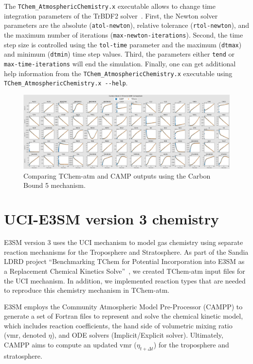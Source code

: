 \documentclass[report, 12pt]{SANDreport}
\begin{document}
The \verb|TChem_AtmosphericChemistry.x| executable allows to change time integration parameters of the TrBDF2 solver~\cite{tinesweb}. First, the Newton solver parameters are the absolute (\verb|atol-newton|), relative tolerance (\verb|rtol-newton|), and the maximum number of iterations (\verb|max-newton-iterations|). Second, the time step size is controlled using the \verb|tol-time| parameter and the maximum (\verb|dtmax|) and minimum (\verb|dtmin|) time step values. Third, the parameters either \verb|tend| or \verb|max-time-iterations| will end the simulation. Finally, one can get additional help information from the \verb|TChem_AtmosphericChemistry.x| executable using \verb|TChem_AtmosphericChemistry.x --help|.


\begin{figure}[htp]
  \centering
  \includegraphics[width=1\textwidth]{../figures/carbonB5TChemvsCAMP.png}
  \caption{Comparing TChem-atm and CAMP outputs using the Carbon Bound 5 mechanism.}
\label{fig:camp_vs_tchem-atm}
\end{figure}


\section{UCI-E3SM version 3 chemistry}

E3SM version 3 uses the UCI mechanism to model gas chemistry using separate reaction mechanisms for the Troposphere and Stratosphere. As part of the Sandia LDRD project ``Benchmarking TChem for Potential Incorporation into E3SM as a Replacement Chemical Kinetics Solve''~\cite{Diaz-Ibarra:2024:tchem}, we created TChem-atm input files for the UCI mechanism. In addition, we implemented reaction types that are needed to reproduce this chemistry mechanism in TChem-atm.

E3SM employs the Community Atmospheric Model Pre-Processor (CAMPP) to generate a set of Fortran files to represent and solve the chemical kinetic model, which includes reaction coefficients, the hand side of volumetric mixing ratio (vmr, denoted $\eta$), and ODE solvers (Implicit/Explicit solver). Ultimately, CAMPP aims to compute an updated vmr ($\eta_{t+\Delta t}$) for the troposphere and stratosphere.
\end{document}
